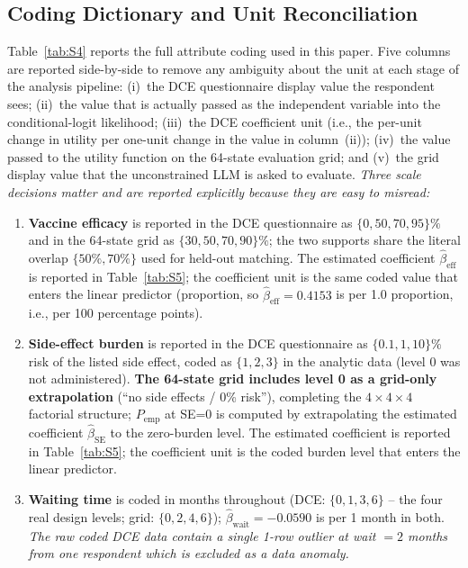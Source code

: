 \documentclass[11pt]{article}
\begin{document}
\subsection{Coding Dictionary and Unit Reconciliation}
\label{sec:coding_dict}

Table~\ref{tab:S4} reports the full attribute coding used in this paper. Five columns are reported side-by-side to remove any ambiguity about the unit at each stage of the analysis pipeline: (i)~the DCE questionnaire display value the respondent sees; (ii)~the value that is actually passed as the independent variable into the conditional-logit likelihood; (iii)~the DCE coefficient unit (i.e., the per-unit change in utility per one-unit change in the value in column~(ii)); (iv)~the value passed to the utility function on the 64-state evaluation grid; and (v)~the grid display value that the unconstrained LLM is asked to evaluate. \emph{Three scale decisions matter and are reported explicitly because they are easy to misread:}

\begin{enumerate}
\item \textbf{Vaccine efficacy} is reported in the DCE questionnaire as $\{0, 50, 70, 95\}\%$ and in the 64-state grid as $\{30, 50, 70, 90\}\%$; the two supports share the literal overlap $\{50\%, 70\%\}$ used for held-out matching. The estimated coefficient $\hat\beta_{\text{eff}}$ is reported in Table~\ref{tab:S5}; the coefficient unit is the same coded value that enters the linear predictor (proportion, so $\hat\beta_{\text{eff}} = 0.4153$ is per 1.0 proportion, i.e., per 100 percentage points).

\item \textbf{Side-effect burden} is reported in the DCE questionnaire as $\{0.1, 1, 10\}\%$ risk of the listed side effect, coded as $\{1, 2, 3\}$ in the analytic data (level 0 was not administered). \textbf{The 64-state grid includes level 0 as a grid-only extrapolation} (``no side effects / 0\% risk''), completing the $4\times4\times4$ factorial structure; $P_{\text{emp}}$ at SE=0 is computed by extrapolating the estimated coefficient $\hat\beta_{\text{SE}}$ to the zero-burden level. The estimated coefficient is reported in Table~\ref{tab:S5}; the coefficient unit is the coded burden level that enters the linear predictor.
\item \textbf{Waiting time} is coded in months throughout (DCE: $\{0, 1, 3, 6\}$ -- the four real design levels; grid: $\{0, 2, 4, 6\}$); $\hat\beta_{\text{wait}} = -0.0590$ is per 1 month in both. \emph{The raw coded DCE data contain a single 1-row outlier at wait $= 2$ months from one respondent which is excluded as a data anomaly.}
\end{enumerate}
\end{document}
